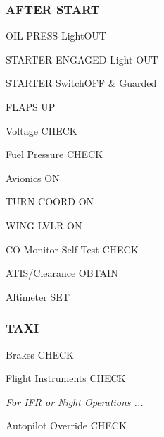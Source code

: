 \begin{multicols}{2}
\subsubsection*{AFTER START}
\begin{enumerate*}
\item OIL PRESS Light\dotfill OUT
\item STARTER ENGAGED Light \dotfill OUT
\item STARTER Switch\dotfill OFF \& Guarded
\item FLAPS \dotfill UP
\item Voltage \dotfill CHECK
\item Fuel Pressure \dotfill CHECK
\item Avionics \dotfill ON
\item TURN COORD \dotfill ON
\item WING LVLR \dotfill ON
\item CO Monitor Self Test \dotfill CHECK
\item ATIS/Clearance \dotfill OBTAIN
\item Altimeter \dotfill SET
\end{enumerate*}

\subsubsection*{TAXI}
\begin{enumerate*}
\item Brakes \dotfill CHECK
\item Flight Instruments \dotfill CHECK
\item  \emph{For IFR or Night Operations ...}
\begin{itemize*}
\item Autopilot Override \dotfill CHECK
\end{itemize*}
\end{enumerate*}


\end{multicols}
